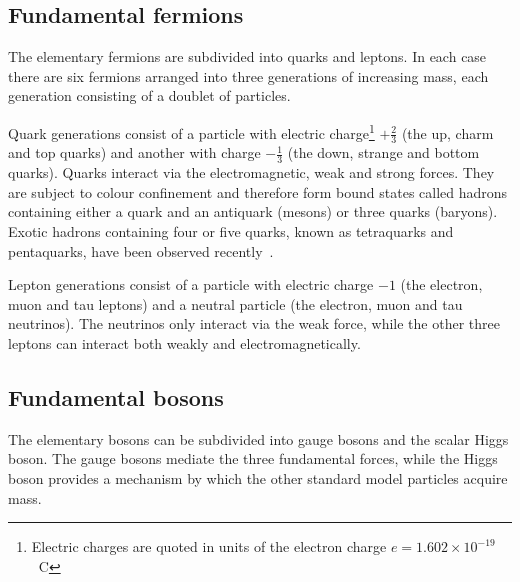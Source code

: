 \subsection{Fundamental fermions}
The elementary fermions are subdivided into quarks and leptons. In each case 
there are six fermions arranged into three generations of increasing mass, each 
generation consisting of a doublet of particles.

Quark generations consist of a particle with electric charge\footnote{Electric 
charges are quoted in units of the electron charge $e=1.602\times10^{-19}$~C} 
$+\frac{2}{3}$ (the up, charm and top quarks) and another with charge 
$-\frac{1}{3}$ (the down, strange and bottom quarks). Quarks interact via the 
electromagnetic, weak and strong forces. They are subject to colour confinement 
and therefore form bound states called hadrons containing either a quark and an 
antiquark (mesons) or three quarks (baryons).
Exotic hadrons containing four or five quarks, known as tetraquarks and 
pentaquarks, have been observed recently~\cite{tetrapenta}.

Lepton generations consist of a particle with electric charge $-1$ (the 
electron, muon and tau leptons) and a neutral particle (the electron, muon and 
tau neutrinos). The neutrinos only interact via the weak force, while the other 
three leptons can interact both weakly and electromagnetically.

\subsection{Fundamental bosons}
The elementary bosons can be subdivided into gauge bosons and the scalar Higgs 
boson. The gauge bosons mediate the three fundamental forces, while the Higgs 
boson provides a mechanism by which the other standard model particles acquire 
mass.

